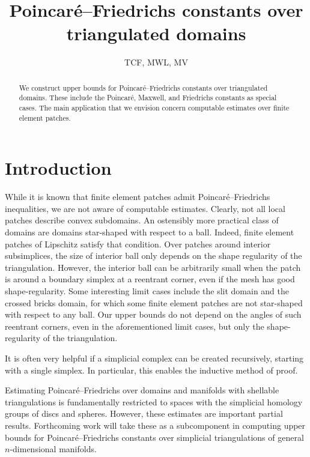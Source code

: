 \documentclass[a4paper]{amsart}
\title{Poincar\'e--Friedrichs constants over triangulated domains}
\author{TCF, MWL, MV}
\begin{document}
\maketitle

\begin{abstract}
    We construct upper bounds for Poincar\'e--Friedrichs constants over triangulated domains. 
    These include the Poincar\'e, Maxwell, and Friedrichs constants as special cases. 
    The main application that we envision concern computable estimates over finite element patches. 
\end{abstract}

\section{Introduction}






While it is known that finite element patches admit Poincar\'e--Friedrichs inequalities, 
we are not aware of computable estimates. 
Clearly, not all local patches describe convex subdomains. 
An ostensibly more practical class of domains are domains star-shaped with respect to a ball.
Indeed, finite element patches of Lipschitz satisfy that condition. 
Over patches around interior subsimplices, the size of interior ball only depends on the shape regularity of the triangulation. However, the interior ball can be arbitrarily small when the patch is around a boundary simplex at a reentrant corner, even if the mesh has good shape-regularity. 
Some interesting limit cases include the slit domain and the crossed bricks domain,
for which some finite element patches are not star-shaped with respect to any ball. 
\color{red}Our upper bounds do not depend on the angles of such reentrant corners, even in the aforementioned limit cases, but only the shape-regularity of the triangulation. \color{black}


It is often very helpful if a simplicial complex can be created recursively, starting with a single simplex. 
In particular, this enables the inductive method of proof.


Estimating Poincar\'e--Friedrichs over domains and manifolds with shellable triangulations is fundamentally restricted to spaces with the simplicial homology groups of discs and spheres. However, these estimates are important partial results. Forthcoming work will take these as a subcomponent in computing upper bounds for Poincar\'e--Friedrichs constants over simplicial triangulations of general $n$-dimensional manifolds. 
\end{document}

